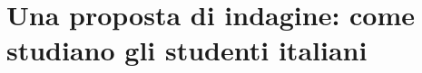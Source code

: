%
%
%
\chapter{Una proposta di indagine: come studiano gli studenti italiani}
\label{app:indagine}

